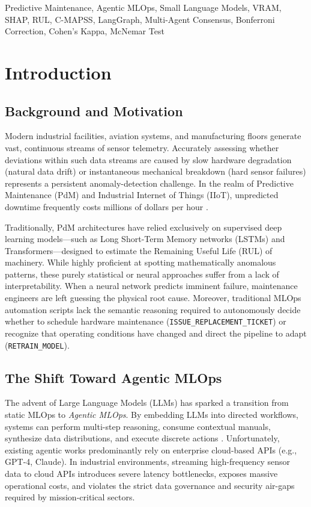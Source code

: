 \documentclass[conference, 10pt]{IEEEtran}
\begin{document}
\begin{IEEEkeywords}
Predictive Maintenance, Agentic MLOps, Small Language Models, VRAM, SHAP, RUL, C-MAPSS, LangGraph, Multi-Agent Consensus, Bonferroni Correction, Cohen's Kappa, McNemar Test
\end{IEEEkeywords}

\section{Introduction}
\subsection{Background and Motivation}
Modern industrial facilities, aviation systems, and manufacturing floors generate vast, continuous streams of sensor telemetry. Accurately assessing whether deviations within such data streams are caused by slow hardware degradation (natural data drift) or instantaneous mechanical breakdown (hard sensor failures) represents a persistent anomaly-detection challenge. In the realm of Predictive Maintenance (PdM) and Industrial Internet of Things (IIoT), unpredicted downtime frequently costs millions of dollars per hour \cite{cmapss}.

Traditionally, PdM architectures have relied exclusively on supervised deep learning models---such as Long Short-Term Memory networks (LSTMs) and Transformers---designed to estimate the Remaining Useful Life (RUL) of machinery. While highly proficient at spotting mathematically anomalous patterns, these purely statistical or neural approaches suffer from a lack of interpretability. When a neural network predicts imminent failure, maintenance engineers are left guessing the physical root cause. Moreover, traditional MLOps automation scripts lack the semantic reasoning required to autonomously decide whether to schedule hardware maintenance (\texttt{ISSUE\_REPLACEMENT\_TICKET}) or recognize that operating conditions have changed and direct the pipeline to adapt (\texttt{RETRAIN\_MODEL}).

\subsection{The Shift Toward Agentic MLOps}
The advent of Large Language Models (LLMs) has sparked a transition from static MLOps to \textit{Agentic MLOps}. By embedding LLMs into directed workflows, systems can perform multi-step reasoning, consume contextual manuals, synthesize data distributions, and execute discrete actions \cite{langgraph}. Unfortunately, existing agentic works predominantly rely on enterprise cloud-based APIs (e.g., GPT-4, Claude). In industrial environments, streaming high-frequency sensor data to cloud APIs introduces severe latency bottlenecks, exposes massive operational costs, and violates the strict data governance and security air-gaps required by mission-critical sectors.
\end{document}
